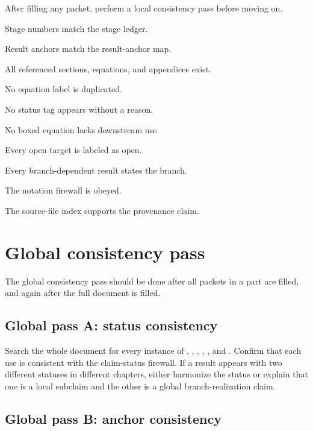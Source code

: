 After filling any packet, perform a local consistency pass before moving on.

\begin{verificationchecklist}
\item Stage numbers match the stage ledger.
\item Result anchors match the result-anchor map.
\item All referenced sections, equations, and appendices exist.
\item No equation label is duplicated.
\item No status tag appears without a reason.
\item No boxed equation lacks downstream use.
\item Every open target is labeled as open.
\item Every branch-dependent result states the branch.
\item The notation firewall is obeyed.
\item The source-file index supports the provenance claim.
\end{verificationchecklist}

\section{Global consistency pass}
\label{sec:global-consistency-pass}

The global consistency pass should be done after all packets in a part are filled, and again after the full document is filled.

\subsection{Global pass A: status consistency}
\label{subsec:global-pass-status-consistency}

Search the whole document for every instance of \StatusExact{}, \StatusExactClosure{}, \StatusReduced{}, \StatusEffective{}, \StatusNumerical{}, and \StatusOpen{}.  Confirm that each use is consistent with the claim-status firewall.  If a result appears with two different statuses in different chapters, either harmonize the status or explain that one is a local subclaim and the other is a global branch-realization claim.

\subsection{Global pass B: anchor consistency}
\label{subsec:global-pass-anchor-consistency}

